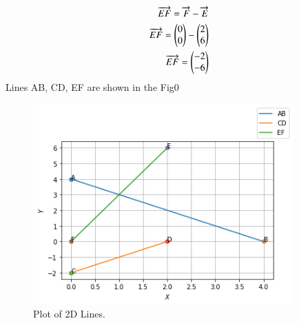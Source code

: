 \documentclass[journal,12pt,twocolumn]{IEEEtran}
\begin{document}
\begin{align}
\overrightarrow{EF} =\overrightarrow{F}-\overrightarrow{E}\\
\overrightarrow{EF} =\begin{pmatrix}0\\0\end{pmatrix}-\begin{pmatrix}2\\6\end{pmatrix}\\
\overrightarrow{EF} =\begin{pmatrix}-2\\-6\end{pmatrix}
\end{align}
Lines AB, CD, EF are shown in the Fig0
\begin{figure}[h!]
    \centering
    \includegraphics[width=10cm]{lines.png}
    \caption{Plot of 2D Lines.}
    \label{Plot of the 2D Lines}
\end{figure}
\end{document}
